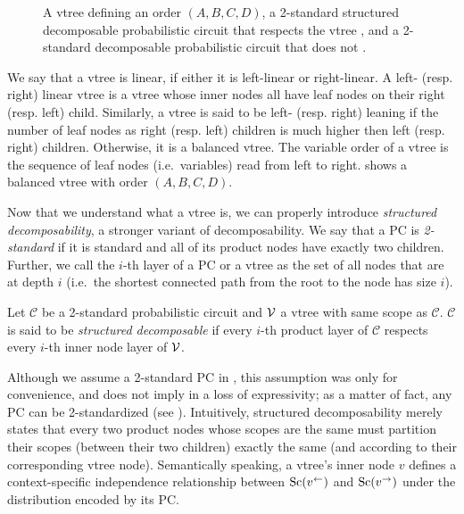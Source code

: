 \begin{figure}[t]
\begin{subfigure}[t]{0.35\textwidth}
{
    }
    \caption{}
    \label{fig:norespect}
  \end{subfigure}
  \caption{A vtree  defining an order $(A,B,C,D)$, a 2-standard structured
    decomposable probabilistic circuit that respects the vtree , and a 2-standard
    decomposable probabilistic circuit that does not .}
  \label{fig:vtreeresp}
\end{figure}

We say that a vtree is linear, if either it is left-linear or right-linear. A left- (resp. right)
linear vtree is a vtree whose inner nodes all have leaf nodes on their right (resp. left) child.
Similarly, a vtree is said to be left- (resp. right) leaning if the number of leaf nodes as right
(resp. left) children is much higher then left (resp. right) children. Otherwise, it is a balanced
vtree. The variable order of a vtree is the sequence of leaf nodes (i.e.\ variables) read from left
to right.  shows a balanced vtree with order $(A,B,C,D)$.

Now that we understand what a vtree is, we can properly introduce \emph{structured decomposability},
a stronger variant of decomposability. We say that a PC is \emph{2-standard} if it is standard and
all of its product nodes have exactly two children. Further, we call the $i$-th layer of a PC or a
vtree as the set of all nodes that are at depth $i$ (i.e.\ the shortest connected path from the
root to the node has size $i$).

\begin{definition}
  \label{def:sdec}%
  Let $\mathcal{C}$ be a 2-standard probabilistic circuit and $\operatorname{\mathcal{V}}$ a vtree with same scope as
  $\mathcal{C}$. $\mathcal{C}$ is said to be \emph{structured decomposable} if every $i$-th product
  layer of $\mathcal{C}$ respects every $i$-th inner node layer of $\operatorname{\mathcal{V}}$.
\end{definition}

Although we assume a 2-standard PC in , this assumption was only for convenience,
and does not imply in a loss of expressivity; as a matter of fact, any PC can be 2-standardized
(see ). Intuitively, structured decomposability merely states that every two
product nodes whose scopes are the same must partition their scopes (between their two children)
exactly the same (and according to their corresponding vtree node). Semantically speaking, a
vtree's inner node $v$ defines a context-specific independence relationship between $\operatorname*{\normalfont{Sc}}(v^\gets)$
and $\operatorname*{\normalfont{Sc}}(v^\to)$ under the distribution encoded by its PC.

